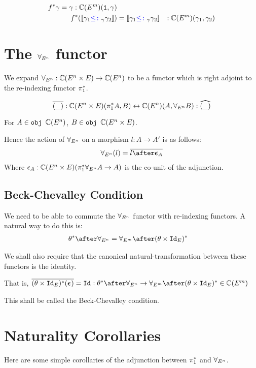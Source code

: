 \begin{align*}
    f^*{\gamma} = \gamma: \mathbb{C}(E^m)(\texttt{1}, \gamma)\\
    f^*({\bf [\![}\gamma_1 {\color{blue} \leq\colon}_\gamma \gamma_2{\bf ]\!]}) & = {\bf [\![}\gamma_1 {\color{blue} \leq\colon}_\gamma \gamma_2{\bf ]\!]} &: \mathbb{C}(E^m)(\gamma_1, \gamma_2)\\
\end{align*}

\section{The $\forall_{E^n}$ functor}

We expand $\forall_{E^n}: \mathbb{C}(E^n\times E) \rightarrow \mathbb{C}(E^n)$ to be a functor which is right adjoint to the re-indexing functor $\pi_1^*$.

\begin{equation}
    \bar{(\_)}: \C(E^n\times E)(\pstar A, B) \leftrightarrow \C(E^n)(A, \allEn B) : \widehat{(\_)}
\end{equation}

For $A\in\texttt{obj }\mathbb{C}(E^n)$, $B\in\texttt{obj }\mathbb{C}(E^n\times E)$.

Hence the action of $\forall_{E^n}$ on a morphism $l : A\rightarrow A'$ is as follows:
\begin{eqnarray}
    \allEn(l) = \bar{l\after\counit{A}}
\end{eqnarray}
Where $\epsilon_A: \mathbb{C}(E^n\times E)(\pi_1^*\forall_{E^n} A \rightarrow A)$ is the co-unit of the adjunction.

\subsection{Beck-Chevalley Condition}
We need to be able to commute the $\forall_{E^n}$ functor with re-indexing functors. A natural way to do this is:
\begin{align*}
    \theta\star\after\allEn & = \allEm\after(\theta\times\Id{E})\star
\end{align*}

We shall also require that the canonical natural-transformation between these functors is the identity.

That is, $\bar{(\theta\times\Id{E})\star(\counit{})} = \Id{}: \theta\star\after\allEn \rightarrow \allEm\after(\theta\times\Id{E})\star\in \C(E^m)$

This shall be called the Beck-Chevalley condition.


\section{Naturality Corollaries}
Here are some simple corollaries of the adjunction between $\pi_1^*$ and $\forall_{E^n}$.
    

